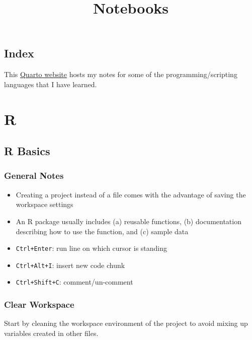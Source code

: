 \documentclass[
  letterpaper,
  DIV=11,
  numbers=noendperiod]{scrreprt}
\title{Notebooks}
\author{}
\date{}
\providecommand{\tightlist}{%
  \setlength{\itemsep}{0pt}\setlength{\parskip}{0pt}}\usepackage{longtable,booktabs,array}
\renewcommand*\contentsname{Table of contents}
\newcommand\contentsname{Table of contents}
\begin{document}
\maketitle

\renewcommand*\contentsname{Table of contents}
{
\hypersetup{linkcolor=}
\setcounter{tocdepth}{2}
\tableofcontents
}

\chapter{Index}\label{index}

This \href{https://quarto.org/docs/websites}{Quarto website} hosts my
notes for some of the programming/scripting languages that I have
learned.

\part{R}

\chapter{R Basics}\label{r-basics}

\section{General Notes}\label{general-notes}

\begin{itemize}
\tightlist
\item
  Creating a project instead of a file comes with the advantage of
  saving the workspace settings
\item
  An R package usually includes (a) reusable functions, (b)
  documentation describing how to use the function, and (c) sample data
\item
  \texttt{Ctrl+Enter}: run line on which cursor is standing
\item
  \texttt{Ctrl+Alt+I}: insert new code chunk
\item
  \texttt{Ctrl+Shift+C}: comment/un-comment
\end{itemize}

\section{Clear Workspace}\label{clear-workspace}

Start by cleaning the workspace environment of the project to avoid
mixing up variables created in other files.
\end{document}
